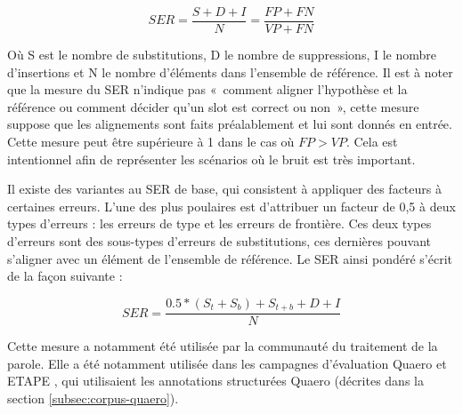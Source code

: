 \documentclass[PhD-Yoann-Dupont.tex]{subfiles}
\begin{document}
\begin{equation}\label{eq:SER-base}
SER = \frac{S + D + I}{N} = \frac{FP + FN}{VP + FN}
\end{equation}

Où S est le nombre de substitutions, D le nombre de suppressions, I le nombre d'insertions et N le nombre d'éléments dans l'ensemble de référence. Il est à noter que la mesure du SER n'indique pas «\ comment aligner l'hypothèse et la référence ou comment décider qu'un slot est correct ou non\ », cette mesure suppose que les alignements sont faits préalablement et lui sont donnés en entrée. Cette mesure peut être supérieure à 1 dans le cas où $FP > VP$. Cela est intentionnel afin de représenter les scénarios où le bruit est très important.

Il existe des variantes au SER de base, qui consistent à appliquer des facteurs à certaines erreurs. L'une des plus poulaires est d'attribuer un facteur de 0,5 à deux types d'erreurs : les erreurs de type et les erreurs de frontière. Ces deux types d'erreurs sont des sous-types d'erreurs de substitutions, ces dernières pouvant s'aligner avec un élément de l'ensemble de référence. Le SER ainsi pondéré s'écrit de la façon suivante :

\begin{equation}\label{eq:SER-weighted}
SER = \frac{0.5*(S_{t} + S_{b}) + S_{t+b} + D + I}{N}
\end{equation}

Cette mesure a notamment été utilisée par la communauté du traitement de la parole. Elle a été notamment utilisée dans les campagnes d'évaluation Quaero \citep{galibert2011structured} et ETAPE \citep{gravier2012etape}, qui utilisaient les annotations structurées Quaero (décrites dans la section \ref{subsec:corpus-quaero}).

\end{document}
